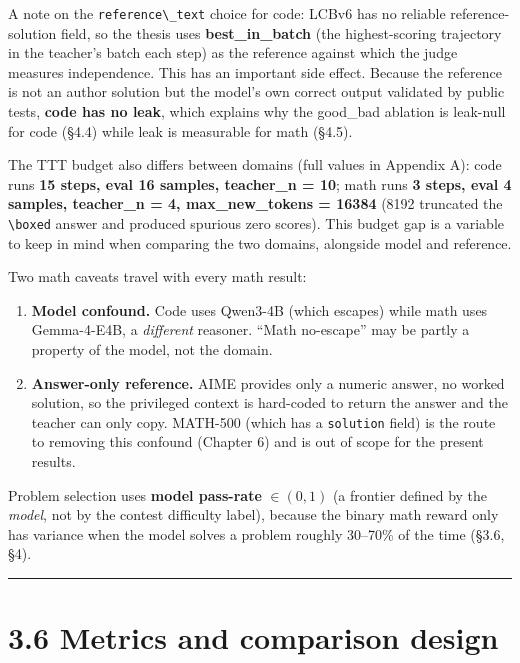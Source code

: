 A note on the \passthrough{\lstinline!reference\_text!} choice for code: LCBv6 has no reliable reference-solution field, so the thesis uses \textbf{best\_in\_batch} (the highest-scoring trajectory in the teacher's batch each step) as the reference against which the judge measures independence. This has an important side effect. Because the reference is not an author solution but the model's own correct output validated by public tests, \textbf{code has no leak}, which explains why the good\_bad ablation is leak-null for code (§4.4) while leak is measurable for math (§4.5).

The TTT budget also differs between domains (full values in Appendix A): code runs \textbf{15 steps, eval 16 samples, teacher\_n = 10}; math runs \textbf{3 steps, eval 4 samples, teacher\_n = 4, max\_new\_tokens = 16384} (8192 truncated the \passthrough{\lstinline!\\boxed!} answer and produced spurious zero scores). This budget gap is a variable to keep in mind when comparing the two domains, alongside model and reference.

Two math caveats travel with every math result:

\begin{enumerate}
\def\labelenumi{\arabic{enumi}.}
\tightlist
\item
  \textbf{Model confound.} Code uses Qwen3-4B (which escapes) while math uses Gemma-4-E4B, a \emph{different} reasoner. ``Math no-escape'' may be partly a property of the model, not the domain.
\item
  \textbf{Answer-only reference.} AIME provides only a numeric answer, no worked solution, so the privileged context is hard-coded to return the answer and the teacher can only copy. MATH-500 (which has a \passthrough{\lstinline!solution!} field) is the route to removing this confound (Chapter 6) and is out of scope for the present results.
\end{enumerate}

Problem selection uses \textbf{model pass-rate} \(\in (0,1)\) (a frontier defined by the \emph{model}, not by the contest difficulty label), because the binary math reward only has variance when the model solves a problem roughly 30--70\% of the time (§3.6, §4).

\begin{center}\rule{0.5\linewidth}{0.5pt}\end{center}

\section{3.6 Metrics and comparison design}\label{metrics-and-comparison-design}

